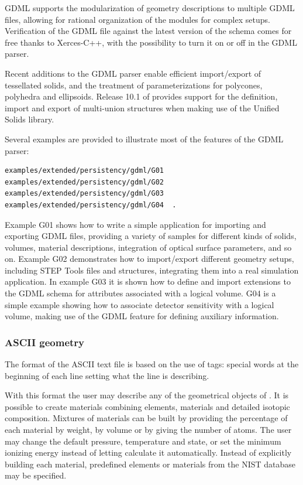 GDML supports the modularization of geometry descriptions to multiple GDML
files, allowing for rational organization of the modules for complex setups.
Verification of the GDML file against the latest version of the schema comes
for free thanks to Xerces-C++, with the possibility to turn it on or off in
the \Gfour{} GDML parser.

Recent additions to the GDML parser enable efficient import/export of 
tessellated solids, and the treatment of parameterizations for polycones, 
polyhedra and ellipsoids.  Release 10.1 of \Gfour{} provides support for the
definition, import and export of multi-union structures when making use of the
Unified Solids library.

Several examples are provided to illustrate most of the features of the 
\Gfour{} GDML parser:
\begin{verbatim}
examples/extended/persistency/gdml/G01
examples/extended/persistency/gdml/G02
examples/extended/persistency/gdml/G03
examples/extended/persistency/gdml/G04  .
\end{verbatim}
Example G01 shows how to write a simple application for importing and exporting
GDML files, providing a variety of samples for different kinds of solids, 
volumes, material descriptions, integration of optical surface parameters, and
so on.  Example G02 demonstrates how to import/export different geometry setups,
including STEP Tools \cite{detmodeling:STEPTools} files and structures, 
integrating them into a real simulation application.  In example G03 it is shown
how to define and import extensions to the GDML schema for attributes associated 
with a logical volume.  G04 is a simple example showing how to associate 
detector sensitivity with a logical volume, making use of the GDML feature for 
defining auxiliary information.

\subsubsection*{ASCII geometry}

The format of the ASCII text file is based on the use of tags: special words at
the beginning of each line setting what the line is describing. 

With this format the user may describe any of the geometrical objects of \Gfour{}.
It is possible to create materials combining elements, materials and detailed
isotopic composition.  Mixtures of materials can be built by providing the 
percentage of each material by weight, by volume or by giving the number of 
atoms.  The user may change the default pressure, temperature and state, or set
the minimum ionizing energy instead of letting \Gfour{} calculate it 
automatically.  Instead of explicitly building each material, predefined 
elements or materials from the \Gfour{} NIST database may be specified.

